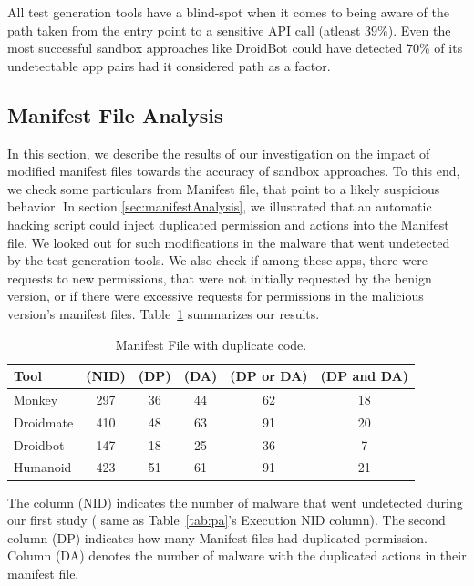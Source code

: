 \begin{obs}{2}{}
 All test generation tools have a blind-spot when it comes to being aware of the path taken from the entry point to a sensitive API call (atleast $39\%$). Even the most successful sandbox approaches like DroidBot could have detected $70\%$ of its undetectable app pairs had it considered path as a factor. 
\end{obs}


\subsection{Manifest File Analysis}\label{sec:manifest}

In this section, we describe the results of our investigation on the impact of modified manifest files towards the accuracy of sandbox approaches. 
To this end, we check some particulars from Manifest file, that point to a likely suspicious behavior. In section \ref{sec:manifestAnalysis}, we illustrated that an automatic hacking script could inject duplicated permission and actions into the Manifest file. We looked out for such modifications in the malware that went undetected by the test generation tools. We also check if among these apps, there were requests to new permissions, that were not initially requested by the benign version, or if there were excessive requests for permissions in the malicious version's manifest files. Table~\ref{tab:mfa} summarizes our results. 

\begin{table}[ht]
  \caption{Manifest File with duplicate code.}
  \centering
  \begin{small}
 \begin{tabular}{lccccc}
   \toprule
   Tool & (NID) & (DP) & (DA) & (DP or DA) & (DP and DA) \\   \midrule
   Monkey &  297 & 36 & 44 & 62 & 18 \\ 
   Droidmate &  410 & 48 & 63 & 91 & 20 \\ 
   Droidbot &  147 & 18 & 25 & 36 & 7 \\ 
   Humanoid &  423 & 51 & 61 & 91 & 21 \\ 
 \bottomrule
 \end{tabular}
 \end{small}
 \label{tab:mfa}
\end{table}

The column (NID) indicates the number of malware that went undetected during our first study ( same as Table~\ref{tab:pa}'s Execution NID column). The second column (DP) indicates how many Manifest files had duplicated permission. Column (DA) denotes the number of malware with the duplicated actions in their manifest file.


